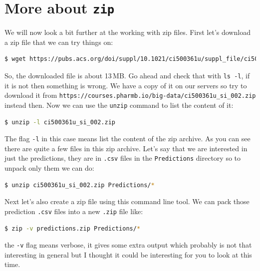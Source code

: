 \documentclass[watermark]{pbpreprint}
\begin{document}
\section{More about \texttt{zip}}
We will now look a bit further at the working with zip files. First let's
download a zip file that we can try things on:
%
\begin{lstlisting}[language=bash,escapechar={|},basicstyle=\ttfamily\footnotesize,breaklines=true,
           postbreak=\mbox{\textcolor{red}{$\nicearrow$}\space}]
$ wget https://pubs.acs.org/doi/suppl/10.1021/ci500361u/suppl_file/ci500361u_si_002.zip
\end{lstlisting}
So, the downloaded file is about 13\,MB. Go ahead and check that with
\texttt{ls -l}, if it is not then something is wrong. We have a copy of it on
our servers so try to download it from
\texttt{https://courses.pharmb.io/big-data/ci500361u\_si\_002.zip} instead then.
Now we can use the \texttt{unzip} command to list the content of it:
%
\begin{lstlisting}[language=bash,escapechar={|},basicstyle=\ttfamily\footnotesize]
$ unzip -l ci500361u_si_002.zip
\end{lstlisting}
The flag \texttt{-l} in this case means list the content of the zip archive. As you can
see there are quite a few files in this zip archive. Let's say that we are
interested in just the predictions, they are in \texttt{.csv} files in the
\texttt{Predictions} directory so to unpack only them we can do:
%
\begin{lstlisting}[language=bash,escapechar={|},basicstyle=\ttfamily\footnotesize]
$ unzip ci500361u_si_002.zip Predictions/*
\end{lstlisting}
Next let's also create a zip file using this command line tool. We can pack
those prediction \texttt{.csv} files into a new \texttt{.zip} file like:
%
\begin{lstlisting}[language=bash,escapechar={|},basicstyle=\ttfamily\footnotesize]
$ zip -v predictions.zip Predictions/* 
\end{lstlisting}
the \texttt{-v} flag means verbose, it gives some extra output which probably
is not that interesting in general but I thought it could be interesting
for you to look at this time. 
\end{document}

